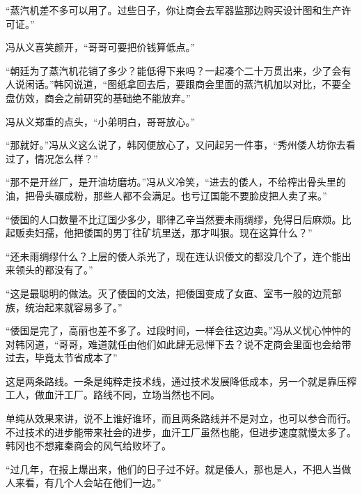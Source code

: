 “蒸汽机差不多可以用了。过些日子，你让商会去军器监那边购买设计图和生产许可证。”

冯从义喜笑颜开，“哥哥可要把价钱算低点。”

“朝廷为了蒸汽机花销了多少？能低得下来吗？一起凑个二十万贯出来，少了会有人说闲话。”韩冈说道，“图纸拿回去后，要跟商会里面的蒸汽机加以对比，不要全盘仿效，商会之前研究的基础绝不能放弃。”

冯从义郑重的点头，“小弟明白，哥哥放心。”

“那就好。”冯从义这么说了，韩冈便放心了，又问起另一件事，“秀州倭人坊你去看过了，情况怎么样？”

“那不是开丝厂，是开油坊磨坊。”冯从义冷笑，“进去的倭人，不给榨出骨头里的油，把骨头碾成粉，那些人都不会满足。也亏辽国能不要脸皮把人卖了来。”

“倭国的人口数量不比辽国少多少，耶律乙辛当然要未雨绸缪，免得日后麻烦。比起贩卖妇孺，他把倭国的男丁往矿坑里送，那才叫狠。现在这算什么？”

“还未雨绸缪什么？上层的倭人杀光了，现在连认识倭文的都没几个了，连个能出来领头的都没有了。”

“这是最聪明的做法。灭了倭国的文法，把倭国变成了女直、室韦一般的边荒部族，统治起来就容易多了。”

“倭国是完了，高丽也差不多了。过段时间，一样会往这边卖。”冯从义忧心忡忡的对韩冈道，“哥哥，难道就任由他们如此肆无忌惮下去？说不定商会里面也会给带过去，毕竟太节省成本了”

这是两条路线。一条是纯粹走技术线，通过技术发展降低成本，另一个就是靠压榨工人，做血汗工厂。路线不同，立场当然也不同。

单纯从效果来讲，说不上谁好谁坏，而且两条路线并不是对立，也可以参合而行。不过技术的进步能带来社会的进步，血汗工厂虽然也能，但进步速度就慢太多了。韩冈也不想雍秦商会的风气给败坏了。

“过几年，在报上爆出来，他们的日子过不好。就是倭人，那也是人，不把人当做人来看，有几个人会站在他们一边。”
